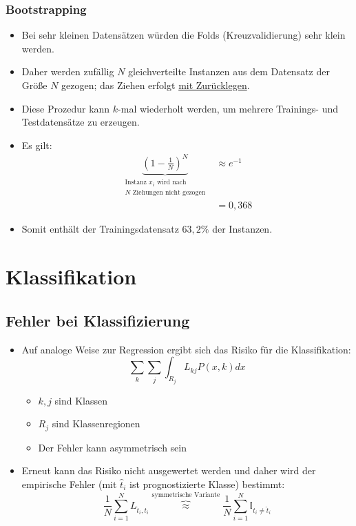 \documentclass{scrartcl}
\begin{document}
\subsubsection{Bootstrapping}

\begin{itemize}
	\item Bei sehr kleinen Datensätzen würden die Folds (Kreuzvalidierung) sehr 
	klein werden.
	\item Daher werden zufällig $ N $ gleichverteilte Instanzen aus dem 
	Datensatz der Größe $ N $ gezogen; das Ziehen erfolgt \underline{mit 
	Zurücklegen}.
	\item Diese Prozedur kann $ k $-mal wiederholt werden, um mehrere 
	Trainings- und Testdatensätze zu erzeugen.
	\item Es gilt:
	\begin{align*}
		\underbrace{(1 - \frac{1}{N})^N}_{\substack{\text{Instanz } x_i \text{ 
		wird nach } \\ N \text{ Ziehungen nicht gezogen}}} &\approx e^{-1} \\
		&= 0,368
	\end{align*}
	\item Somit enthält der Trainingsdatensatz $ 63,2\% $ der Instanzen.
\end{itemize}

\section{Klassifikation}

\subsection{Fehler bei Klassifizierung}

\begin{itemize}
	\item Auf analoge Weise zur Regression ergibt sich das Risiko für die 
	Klassifikation:
	\[ \sum_k \sum_j \int_{R_j} L_{kj} P(x,k) dx \]
	\begin{itemize}
		\item $ k,j $ sind Klassen
		\item $ R_j $ sind Klassenregionen
		\item Der Fehler kann asymmetrisch sein
	\end{itemize}
	\item Erneut kann das Risiko nicht ausgewertet werden und daher wird der 
	empirische Fehler (mit $ \hat{t}_i $ ist prognostizierte Klasse) bestimmt:
	\[ \frac{1}{N} \sum_{i=1}^{N} L_{\hat{t}_i, t_i} 
	\overbrace{\approx}^\text{symmetrische Variante} \frac{1}{N} \sum_{i=1}^{N} 
	\mathbb{I}_{t_i \neq \hat{t}_i} \]
\end{itemize}
\end{document}

